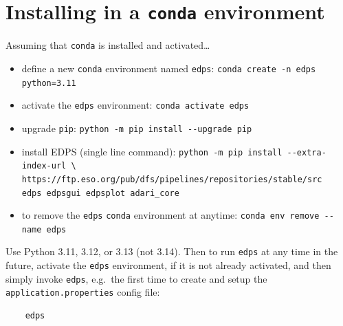 \appendix
\section{Installing in a \texttt{conda} environment}
\label{conda_install}

Assuming that \texttt{conda} is installed and activated\ldots

\begin{itemize}

    \item define a new \texttt{conda} environment named {\tt edps}:\newline
    \verb|conda create -n edps python=3.11|

   \item activate the \texttt{edps} environment: \newline
    \verb|conda activate edps|

   \item upgrade {\tt pip}:\newline
   \verb|python -m pip install --upgrade pip|

   \item install EDPS (single line command): \newline
   \verb|python -m pip install --extra-index-url \|\newline
   \verb|   https://ftp.eso.org/pub/dfs/pipelines/repositories/stable/src|\newline
   \verb|   edps edpsgui edpsplot adari_core|

   \item to remove the \texttt{edps} \texttt{conda} environment at anytime:\newline
   \verb|conda env remove --name edps|

\end{itemize}

Use Python 3.11, 3.12, or 3.13 (not 3.14). Then to run \texttt{edps} at any time in the future, activate the \texttt{edps} environment, if it is not already activated, and then simply invoke \texttt{edps}, e.g.\ the first time to create and setup the {\tt application.properties} config file:
\begin{verbatim}
    edps
\end{verbatim}
